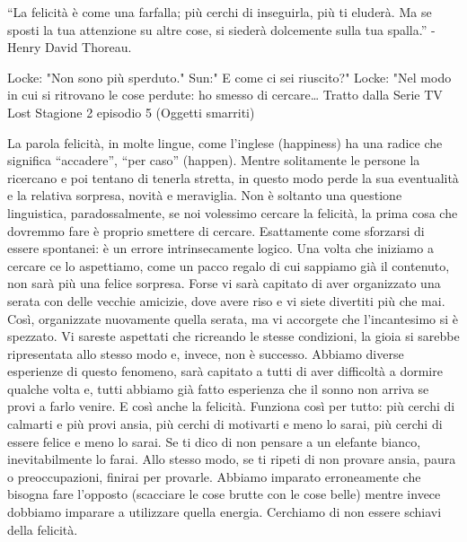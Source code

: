 \documentclass[12pt]{book} %
\begin{document}
“La felicità è come una farfalla; più cerchi di inseguirla, più ti eluderà. Ma se sposti la tua attenzione su altre
cose, si siederà dolcemente sulla tua spalla.” - Henry David Thoreau.

Locke: "Non sono più sperduto." 
Sun:" E come ci sei riuscito?" 
Locke: "Nel modo in cui si ritrovano le cose perdute: ho smesso di cercare…
Tratto dalla Serie TV Lost Stagione 2 episodio 5 (Oggetti smarriti)

La parola felicità, in molte lingue, come l'inglese (happiness) ha una radice che significa
“accadere”, “per caso” (happen). Mentre solitamente le persone la ricercano e poi tentano di tenerla stretta, in questo
modo perde la sua eventualità e la relativa sorpresa, novità e meraviglia. Non è soltanto una questione linguistica,
paradossalmente, se noi volessimo cercare la felicità, la prima cosa che dovremmo fare è proprio smettere di cercare.
Esattamente come sforzarsi di essere spontanei: è un errore intrinsecamente logico. Una volta che iniziamo a cercare ce
lo aspettiamo, come un pacco regalo di cui sappiamo già il contenuto, non sarà più una felice sorpresa. Forse vi sarà
capitato di aver organizzato una serata con delle vecchie amicizie, dove avere riso e vi siete divertiti più che mai.
Così, organizzate nuovamente quella serata, ma vi accorgete che l'incantesimo si è spezzato. Vi
sareste aspettati che ricreando le stesse condizioni, la gioia si sarebbe ripresentata allo stesso modo e, invece, non
è successo. Abbiamo diverse esperienze di questo fenomeno, sarà capitato a tutti di aver difficoltà a dormire qualche volta e, tutti abbiamo già fatto esperienza che il sonno non arriva se provi a farlo venire. E così anche la felicità. 
Funziona così per tutto: più cerchi di calmarti e più provi ansia, più cerchi di motivarti e meno lo sarai, più cerchi di essere felice e meno lo sarai.
Se ti dico di non pensare a un elefante bianco, inevitabilmente lo farai. Allo stesso modo, se ti ripeti di non provare ansia, paura o preoccupazioni, finirai per provarle. Abbiamo imparato erroneamente che bisogna fare l'opposto (scacciare le cose brutte con le cose belle) mentre invece dobbiamo imparare a utilizzare quella energia.
Cerchiamo di non essere schiavi della felicità.
\end{document}
